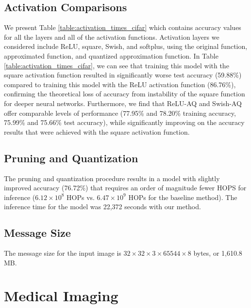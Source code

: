 \documentclass[conference]{IEEEtran}
\begin{document}
\subsection{Activation Comparisons}
We present Table \ref{table:activation_times_cifar} which contains accuracy values for all the layers and all of the activation functions.
Activation layers we considered include ReLU, square, Swish, and softplus, using the original function, approximated function, and quantized approximation function. 
In Table \ref{table:activation_times_cifar}, we can see that training this model with the square activation function resulted in significantly worse test accuracy (59.88\%) compared to training this model with the ReLU activation function (86.76\%), confirming the theoretical loss of accuracy from instability of the square function for deeper neural networks.
Furthermore, we find that ReLU-AQ and Swish-AQ offer comparable levels of performance (77.95\% and 78.20\% training accuracy, 75.99\% and 75.66\% test accuracy), while significantly improving on the accuracy results that were achieved with the square activation function.

\subsection{Pruning and Quantization}
The pruning and quantization procedure results in a model with slightly improved accuracy (76.72\%) that requires an order of magnitude fewer HOPS for inference ($6.12\times10^8$ HOPs vs. $6.47\times10^9$ HOPs for the baseline method).
The inference time for the model was 22,372 seconds with our method.

\subsection{Message Size}
The message size for the input image is $32 \times 32 \times 3 \times 65544 \times 8$ bytes, or 1,610.8 MB.

\section{Medical Imaging}
\end{document}
